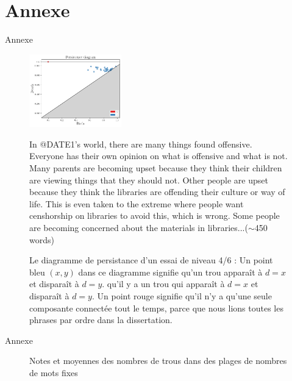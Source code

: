 \documentclass{beamer}
\begin{document}
\section{Annexe}
\begin{frame}{Annexe}
\fontsize{7pt}{8pt}\selectfont
\begin{figure}[H]
\begin{minipage}{0.49\linewidth}
\includegraphics[width=4cm]{pdessay.png}
\end{minipage}
\begin{minipage}{0.49\linewidth}
\begin{mdframed}
In @DATE1's world, there are many things found offensive.  Everyone has their own opinion on what is offensive and what is not. Many parents are becoming upset because they think their children are viewing things that they should not.  Other people are upset because they think the libraries are offending their culture or way of life.  This is even taken to the extreme where people want censhorship on libraries to avoid this, which is wrong.     Some people are becoming concerned about the materials in libraries...($\sim$450 words)
\end{mdframed}
\end{minipage}
\caption{Le diagramme de persistance d'un essai de niveau 4/6 : Un point bleu $(x, y)$ dans ce diagramme signifie qu'un trou apparaît à $d=x$ et disparaît à $d=y$.
qu'il y a un trou qui apparaît à $d=x$ et disparaît à $d=y$.
Un point rouge signifie qu'il n'y a qu'une seule composante connectée tout le temps,
parce que nous lions toutes les phrases par ordre dans la dissertation.
}
\label{fig:pd}
\end{figure}
\end{frame}

\begin{frame}{Annexe}
\begin{figure}[H]
\begin{minipage}[c]{0.67\textwidth}
\scalebox{0.45}{}
\end{minipage}\hfill
\begin{minipage}[c]{0.3\textwidth}
\caption{Notes et moyennes des nombres de trous dans des plages de nombres de mots fixes}
\end{minipage}\hfill
\end{figure}
\end{frame}
\end{document}
